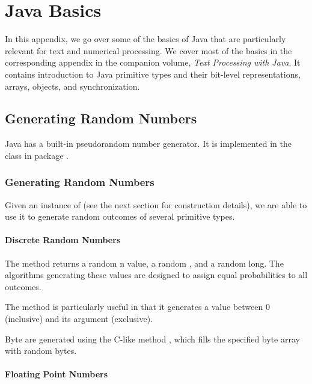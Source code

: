 \chapter{Java Basics}\label{appendix:java}

In this appendix, we go over some of the basics of Java that are
particularly relevant for text and numerical processing.   We
cover most of the basics in the corresponding appendix in the
companion volume, {\it Text Processing with Java}.  It contains
introduction to Java primitive types and their bit-level
representations, arrays, objects, and synchronization.



\section{Generating Random Numbers}\label{appendix:java-random}

Java has a built-in pseudorandom number generator.  It is implemented
in the class  in package .  

\subsection{Generating Random Numbers}

Given an instance of  (see the next section for
construction details), we are able to use it to generate random
outcomes of several primitive types. 

\subsubsection{Discrete Random Numbers}

The method  returns a random n
value,  a random , and  a
random long.  The algorithms generating these values are designed to
assign equal probabilities to all outcomes.  

The method  is particularly useful in that it
generates a value between 0 (inclusive) and its argument (exclusive).

Byte are generated using the C-like method ,
which fills the specified byte array with random bytes.  

\subsubsection{Floating Point Numbers}

